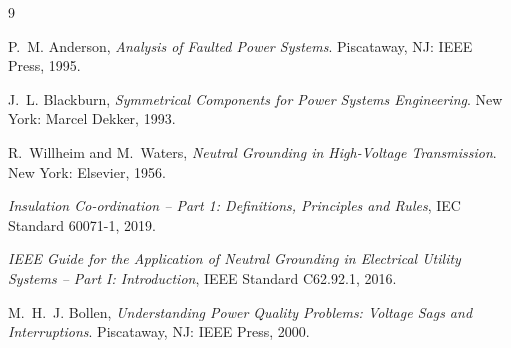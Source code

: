 \documentclass[a4paper,11pt]{article}
\begin{document}
\begin{thebibliography}{9}

P.~M. Anderson, \emph{Analysis of Faulted Power Systems}. Piscataway, NJ:
IEEE Press, 1995.

J.~L. Blackburn, \emph{Symmetrical Components for Power Systems Engineering}.
New York: Marcel Dekker, 1993.

R.~Willheim and M.~Waters, \emph{Neutral Grounding in High-Voltage
Transmission}. New York: Elsevier, 1956.

\emph{Insulation Co-ordination -- Part 1: Definitions, Principles and Rules},
IEC Standard 60071-1, 2019.

\emph{IEEE Guide for the Application of Neutral Grounding in Electrical
Utility Systems -- Part I: Introduction}, IEEE Standard C62.92.1, 2016.

M.~H.~J. Bollen, \emph{Understanding Power Quality Problems: Voltage Sags and
Interruptions}. Piscataway, NJ: IEEE Press, 2000.

\end{thebibliography}
\end{document}
